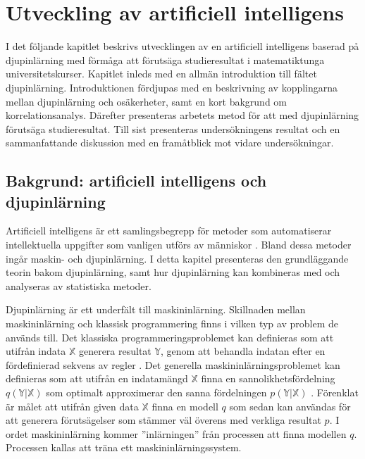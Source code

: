 \chapter{Utveckling av artificiell intelligens}
\label{sec:Deep}

I det följande kapitlet beskrivs utvecklingen av en artificiell intelligens baserad på djupinlärning med förmåga att förutsäga studieresultat i matematiktunga universitetskurser. Kapitlet inleds med en allmän introduktion till fältet djupinlärning. Introduktionen fördjupas med en beskrivning av kopplingarna mellan djupinlärning och osäkerheter, samt en kort bakgrund om korrelationsanalys. Därefter presenteras arbetets metod för att med djupinlärning förutsäga studieresultat. Till sist presenteras undersökningens resultat och en sammanfattande diskussion med en framåtblick mot vidare undersökningar.
\section{Bakgrund: artificiell intelligens och djupinlärning}
\label{sec:DeepBack}

Artificiell intelligens är ett samlingsbegrepp för metoder som automatiserar intellektuella uppgifter som vanligen utförs av människor \cite{Chollet}. Bland dessa metoder ingår maskin- och djupinlärning. I detta kapitel presenteras den grundläggande teorin bakom djupinlärning, samt hur djupinlärning kan kombineras med och analyseras av statistiska metoder. 

Djupinlärning är ett underfält till maskininlärning. Skillnaden mellan maskininlärning och klassisk programmering finns i vilken typ av problem de används till. Det klassiska programmeringsproblemet kan definieras som att utifrån indata $\mathbb{X}$ generera resultat $\mathbb{Y}$, genom att behandla indatan efter en fördefinierad sekvens av regler \cite{JavaGroundUp}. Det generella maskininlärningsproblemet kan definieras som att utifrån en indatamängd $\mathbb{X}$ finna en sannolikhetsfördelning $q\left(\mathbb{Y}|\mathbb{X}\right)$ som optimalt approximerar den sanna fördelningen $p\left(\mathbb{Y}|\mathbb{X}\right)$ \cite{variation}. Förenklat är målet att utifrån given data $\mathbb{X}$ finna en modell $q$ som sedan kan användas för att generera förutsägelser som stämmer väl överens med verkliga resultat $p$. I ordet maskininlärning kommer ''inlärningen'' från processen att finna modellen $q$. Processen kallas att träna ett maskininlärningssystem.


